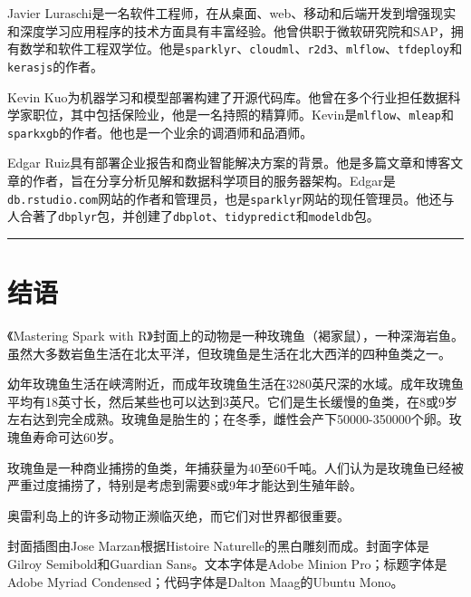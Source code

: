 \documentclass[
]{article}
\begin{document}
Javier
Luraschi是一名软件工程师，在从桌面、web、移动和后端开发到增强现实和深度学习应用程序的技术方面具有丰富经验。他曾供职于微软研究院和SAP，拥有数学和软件工程双学位。他是\texttt{sparklyr}、\texttt{cloudml}、\texttt{r2d3}、\texttt{mlflow}、\texttt{tfdeploy}和\texttt{kerasjs}的作者。

Kevin
Kuo为机器学习和模型部署构建了开源代码库。他曾在多个行业担任数据科学家职位，其中包括保险业，他是一名持照的精算师。Kevin是\texttt{mlflow}、\texttt{mleap}和\texttt{sparkxgb}的作者。他也是一个业余的调酒师和品酒师。

Edgar
Ruiz具有部署企业报告和商业智能解决方案的背景。他是多篇文章和博客文章的作者，旨在分享分析见解和数据科学项目的服务器架构。Edgar是\texttt{db.rstudio.com}网站的作者和管理员，也是\texttt{sparklyr}网站的现任管理员。他还与人合著了\texttt{dbplyr}包，并创建了\texttt{dbplot}、\texttt{tidypredict}和\texttt{modeldb}包。

\begin{center}\rule{0.5\linewidth}{\linethickness}\end{center}

\hypertarget{ux7ed3ux8bed}{%
\section{结语}\label{ux7ed3ux8bed}}

《Mastering Spark with
R》封面上的动物是一种玫瑰鱼（褐家鼠），一种深海岩鱼。虽然大多数岩鱼生活在北太平洋，但玫瑰鱼是生活在北大西洋的四种鱼类之一。

幼年玫瑰鱼生活在峡湾附近，而成年玫瑰鱼生活在3280英尺深的水域。成年玫瑰鱼平均有18英寸长，然后某些也可以达到3英尺。它们是生长缓慢的鱼类，在8或9岁左右达到完全成熟。玫瑰鱼是胎生的；在冬季，雌性会产下50000-350000个卵。玫瑰鱼寿命可达60岁。

玫瑰鱼是一种商业捕捞的鱼类，年捕获量为40至60千吨。人们认为是玫瑰鱼已经被严重过度捕捞了，特别是考虑到需要8或9年才能达到生殖年龄。

奥雷利岛上的许多动物正濒临灭绝，而它们对世界都很重要。

封面插图由Jose Marzan根据Histoire
Naturelle的黑白雕刻而成。封面字体是Gilroy Semibold和Guardian
Sans。文本字体是Adobe Minion Pro；标题字体是Adobe Myriad
Condensed；代码字体是Dalton Maag的Ubuntu Mono。
\end{document}
